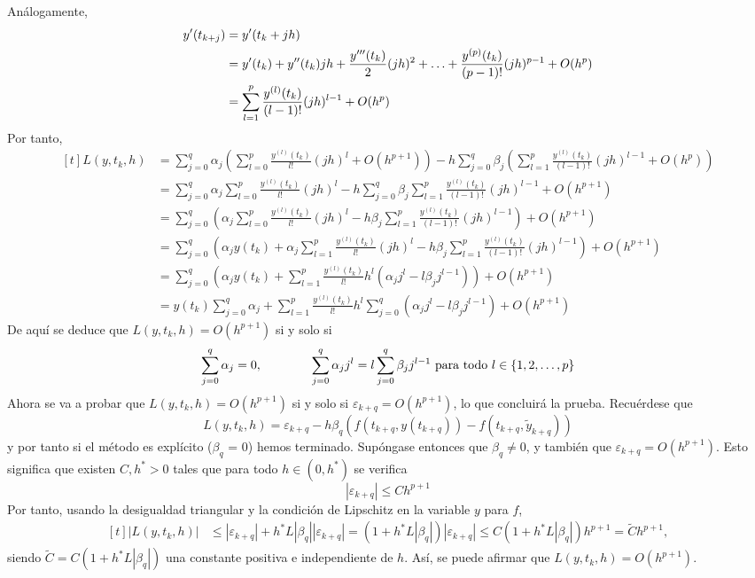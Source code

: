 \documentclass[11pt]{report}
\makeatletter
\renewenvironment{proof}[1][\proofname]{\par
  \pushQED{\qed}%
  \normalfont \topsep\z@skip %
  \trivlist
  \item[\hskip\labelsep
        \itshape
    #1\@addpunct{.}]\ignorespaces
}{%
  \popQED\endtrivlist\@endpefalse
}
\theoremstyle{mytheorem}
\theoremstyle{mydefinition}
\theoremstyle{myexample}
\let\oldproofname=\proofname
\renewcommand{\proofname}{\rm\bf{\oldproofname}}}
\makeatother
\begin{document}
\begin{proof}
\[\]
Análogamente,
\[
\begin{aligned}[t]
    y'(t_{k+j}) &=y'(t_k+jh)\\
    &= y'(t_k)+y''(t_k)jh+\frac{y'''(t_k)}{2}(jh)^2+\mathellipsis+\frac{y^{(p)}(t_k)}{(p-1)!}(jh)^{p-1}+O(h^{p}) \\
    &= \sum_{l=1}^p  \frac{y^{(l)}(t_k)}{(l-1)!}(jh)^{l-1} +O(h^{p})
\end{aligned}
\]
Por tanto,
\[\begin{aligned}[t]
    L(y,t_k,h) &=\sum_{j=0}^q\alpha_j\left(\sum_{l=0}^p  \frac{y^{(l)}(t_k)}{l!}(jh)^l +O(h^{p+1})\right)-h\sum_{j=0}^q\beta_j\left(\sum_{l=1}^p  \frac{y^{(l)}(t_k)}{(l-1)!}(jh)^{l-1} +O(h^{p})\right) \\
    &=\sum_{j=0}^q\alpha_j\sum_{l=0}^p  \frac{y^{(l)}(t_k)}{l!}(jh)^l-h\sum_{j=0}^q\beta_j\sum_{l=1}^p  \frac{y^{(l)}(t_k)}{(l-1)!}(jh)^{l-1} +O(h^{p+1}) \\
    &=\sum_{j=0}^q\left(\alpha_j\sum_{l=0}^p  \frac{y^{(l)}(t_k)}{l!}(jh)^l-h\beta_j\sum_{l=1}^p  \frac{y^{(l)}(t_k)}{(l-1)!}(jh)^{l-1} \right)+O(h^{p+1}) \\
    &=\sum_{j=0}^q\left(\alpha_jy(t_k)+\alpha_j\sum_{l=1}^p  \frac{y^{(l)}(t_k)}{l!}(jh)^l-h\beta_j\sum_{l=1}^p  \frac{y^{(l)}(t_k)}{(l-1)!}(jh)^{l-1} \right)+O(h^{p+1}) \\
    &=\sum_{j=0}^q\left(\alpha_jy(t_k)+\sum_{l=1}^p\frac{y^{(l)}(t_k)}{l!}h^l\left(\alpha_jj^l-l\beta_jj^{l-1}\right)\right)+O(h^{p+1}) \\
    &=y(t_k)\sum_{j=0}^q\alpha_j+\sum_{l=1}^p\frac{y^{(l)}(t_k)}{l!}h^l\sum_{j=0}^q\left(\alpha_jj^l-l\beta_jj^{l-1}\right)+O(h^{p+1})
\end{aligned}\]
De aquí se deduce que $L(y,t_k,h) = O(h^{p+1})$ si y solo si
\[\sum_{j=0}^q\alpha_j = 0, \qquad \qquad \sum_{j=0}^q \alpha_jj^l = l\sum_{j=0}^q \beta_jj^{l-1} \textup{ para todo } l \in \{1,2,\mathellipsis,p\}\]
Ahora se va a probar que $L(y,t_k,h) = O(h^{p+1})$ si y solo si $\varepsilon_{k+q} = O(h^{p+1})$, lo que concluirá la prueba. Recuérdese que
\[L(y,t_k,h) = \varepsilon_{k+q}-h\beta_q\left(f(t_{k+q},y(t_{k+q}))-f(t_{k+q},\widetilde{y}_{k+q})\right)\]
y por tanto si el método es explícito ($\beta_q$ = 0) hemos terminado. Supóngase entonces que $\beta_q \neq 0$, y también que $\varepsilon_{k+q} = O(h^{p+1})$. Esto significa que existen $C,h^*>0$ tales que para todo $h \in (0,h^*)$ se verifica
\[|\varepsilon_{k+q}| \leq Ch^{p+1}\]
Por tanto, usando la desigualdad triangular y la condición de Lipschitz en la variable $y$ para $f$,
\[
\begin{aligned}[t]
|L(y,t_k,h)|&\leq |\varepsilon_{k+q}|+h^*L|\beta_q| |\varepsilon_{k+q}|= (1+h^*L|\beta_q|)|\varepsilon_{k+q}| \leq C(1+h^*L|\beta_q|)h^{p+1} = \widetilde{C}h^{p+1},
\end{aligned}
\]
siendo $\widetilde{C} = C(1+h^*L|\beta_q|)$ una constante positiva e independiente de $h$. Así, se puede afirmar que $L(y,t_k,h) = O(h^{p+1})$. 


\end{proof}
\end{document}
